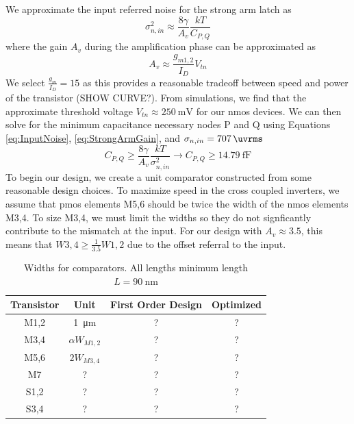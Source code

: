 \documentclass[10pt,journal]{IEEEtran}\usepackage{longtable}
\newcommand{\rowstyle}[1]{\gdef\currentrowstyle{#1}%
  #1\ignorespaces
}
\begin{document}
We approximate the input referred noise for the strong arm latch as
\begin{equation}
\sigma_{n,in}^2\approx\frac{8\gamma}{A_v}\frac{kT}{C_{P,Q}}
\label{eq:InputNoise}
\end{equation}
where the gain $A_v$ during the amplification phase can be approximated as
\begin{equation}
A_v\approx\frac{g_{m1,2}}{I_D}V_{tn}
\label{eq:StrongArmGain}
\end{equation}
We select $\frac{g_m}{I_D}=15$ as this provides a reasonable tradeoff between speed and power of the transistor (SHOW CURVE?). From simulations, we find that the approximate threshold voltage $V_{tn}\approx\SI{250}{\milli\volt}$ for our nmos devices. We can then solve for the minimum capacitance necessary nodes P and Q using Equations \ref{eq:InputNoise}, \ref{eq:StrongArmGain}, and $\sigma_{n,in}=\SI{707}{\uvrms}$ 
\begin{equation}
C_{P,Q}\geq\frac{8\gamma}{A_v}\frac{kT}{\sigma_{n,in}^2}\rightarrow C_{P,Q}\geq\SI{14.79}{\femto\farad}
\end{equation}
To begin our design, we create a unit comparator constructed from some reasonable design choices. To maximize speed in the cross coupled inverters, we assume that pmos elements M5,6 should be twice the width of the nmos elements M3,4. To size M3,4, we must limit the widths so they do not signficantly contribute to the mismatch at the input. For our design with $A_v\approx3.5$, this means that $W3,4\geq\frac{1}{3.5}W1,2$ due to the offset referral to the input. 

\begin{table}[h]
\caption{Widths for comparators. All lengths minimum length $L=\SI{90}{\nano\metre}$}
\begin{center}
\begin{tabular}{c|c|c|c}
\hline \rowstyle{\bfseries} Transistor & \rowstyle{\bfseries} Unit & \rowstyle{\bfseries} First Order Design & \rowstyle{\bfseries} Optimized \\ \hline
M1,2 & \SI{1}{\micro\metre} & ? & ? \\ \hline
M3,4 & $\alpha W_{M1,2}$ & ? & ? \\ \hline
M5,6 & $2W_{M3,4}$ & ? & ? \\ \hline
M7 & ? & ? & ? \\ \hline
S1,2 & ? & ? & ? \\ \hline
S3,4 & ? & ? & ? \\ \hline
\end{tabular}
\end{center}
\label{tbl:ComparatorDesign}
\end{table}
\end{document}
